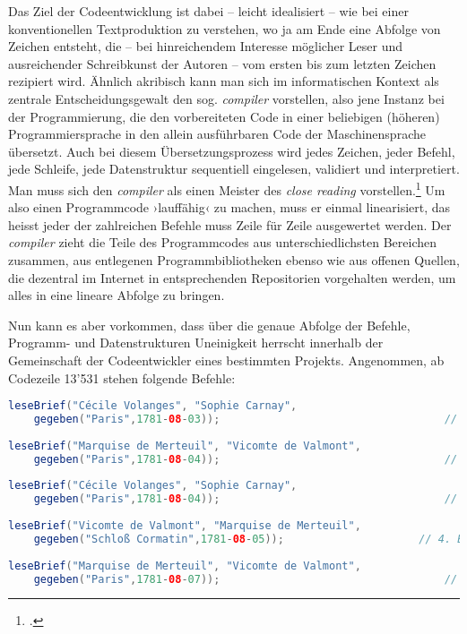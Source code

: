\documentclass[a4paper,11pt]{article}
\newcommand{\inanf}[1]{›#1‹}
\begin{document}
Das Ziel der Codeentwicklung ist dabei – leicht idealisiert – wie bei einer konventionellen Textproduktion zu verstehen, wo ja am Ende eine Abfolge von Zeichen entsteht, die – bei hinreichendem Interesse möglicher Leser und ausreichender Schreibkunst der Autoren – vom ersten bis zum letzten Zeichen rezipiert wird. Ähnlich akribisch kann man sich im informatischen Kontext als zentrale Entscheidungsgewalt den sog. \emph{compiler} vorstellen, also jene Instanz bei der Programmierung, die den vorbereiteten Code in einer beliebigen (höheren) Programmiersprache in den allein ausführbaren Code der Maschinensprache übersetzt. Auch bei diesem Übersetzungsprozess wird jedes Zeichen, jeder Befehl, jede Schleife, jede Datenstruktur sequentiell eingelesen, validiert und interpretiert. Man muss sich den \emph{compiler} als einen Meister des \emph{close reading} vorstellen.\footcite[Hier wäre noch auf die kodifizierende Funktion, das Schliessen des Codes, hinzuweisen, die ja auch vom Compiler vorgenommen wird, vgl.][]{krajewski+vismann:2009} Um also einen Programmcode \inanf{lauffähig} zu machen, muss er einmal linearisiert, das heisst jeder der zahlreichen Befehle muss Zeile für Zeile ausgewertet werden. Der \emph{compiler} zieht die Teile des Programmcodes aus unterschiedlichsten Bereichen zusammen, aus entlegenen Programmbibliotheken ebenso wie aus offenen Quellen, die dezentral im Internet in entsprechenden Repositorien vorgehalten werden, um alles in eine lineare Abfolge zu bringen. 

Nun kann es aber vorkommen, dass über die genaue Abfolge der Befehle, Programm- und Datenstrukturen Uneinigkeit herrscht innerhalb der Gemeinschaft der Codeentwickler eines bestimmten Projekts. Angenommen, ab Codezeile 13'531 stehen folgende Befehle:

\begin{lstlisting}[language=Java, firstnumber=13531]
leseBrief("Cécile Volanges", "Sophie Carnay", 
	gegeben("Paris",1781-08-03));                           		// 1. Brief
	
leseBrief("Marquise de Merteuil", "Vicomte de Valmont", 
	gegeben("Paris",1781-08-04));                           		// 2. Brief
	
leseBrief("Cécile Volanges", "Sophie Carnay", 
	gegeben("Paris",1781-08-04));                           		// 3. Brief
	
leseBrief("Vicomte de Valmont", "Marquise de Merteuil", 
	gegeben("Schloß Cormatin",1781-08-05));                 	// 4. Brief
	
leseBrief("Marquise de Merteuil", "Vicomte de Valmont", 
	gegeben("Paris",1781-08-07));                           		// 5. Brief
\end{lstlisting}
\end{document}
